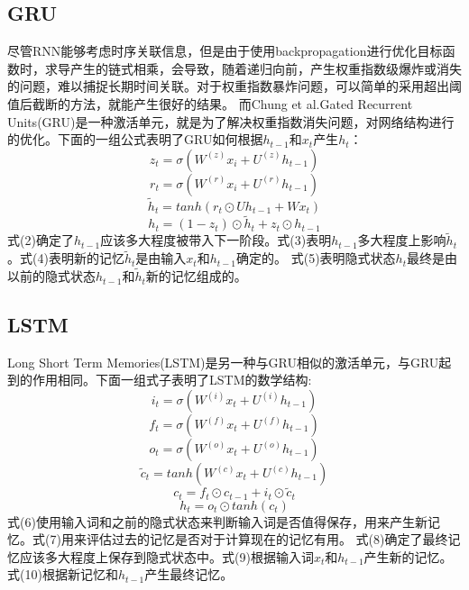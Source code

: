\subsection{GRU}
尽管RNN能够考虑时序关联信息，但是由于使用backpropagation进行优化目标函数时，求导产生的链式相乘，会导致，随着递归向前，产生权重指数级爆炸或消失的问题，难以捕捉长期时间关联。对于权重指数暴炸问题，可以简单的采用超出阈值后截断的方法，就能产生很好的结果。
而Chung et al.\cite{chung2015gated}Gated Recurrent Units(GRU)是一种激活单元，就是为了解决权重指数消失问题，对网络结构进行的优化。下面的一组公式表明了GRU如何根据$h_{t-1}$和$x_t$产生$h_{t}$：\\
\begin{equation}
z_t = \sigma (W^{(z)}x_i + U^{(z)}h_{t-1})
\end{equation}
\begin{equation}
r_t = \sigma (W^{(r)}x_i + U^{(r)}h_{t-1})
\end{equation}
\begin{equation}
\widetilde{h}_t = tanh(r_t \odot Uh_{t-1} + Wx_t)
\end{equation}
\begin{equation}
h_t = (1-z_t) \odot \widetilde{h}_t + z_t \odot h_{t-1}
\end{equation}
式(2)确定了$h_{t-1}$应该多大程度被带入下一阶段。式(3)表明$h_{t-1}$多大程度上影响$\widetilde{h}_t$。式(4)表明新的记忆$\widetilde{h}_t$是由输入$x_t$和$h_{t-1}$确定的。
式(5)表明隐式状态$h_t$最终是由以前的隐式状态$h_{t-1}$和$\widetilde{h}_t$新的记忆组成的。
\subsection{LSTM}
Long Short Term Memories(LSTM)\cite{hochreiter1997long}是另一种与GRU相似的激活单元，与GRU起到的作用相同。下面一组式子表明了LSTM的数学结构:\\
\begin{equation}
i_t = \sigma (W^{(i)}x_t + U^{(i)}h_{t-1})
\end{equation}
\begin{equation}
f_t = \sigma (W^{(f)}x_t + U^{(f)}h_{t-1})
\end{equation}
\begin{equation}
o_t = \sigma (W^{(o)}x_t + U^{(o)}h_{t-1})
\end{equation}
\begin{equation}
\widetilde{c}_t = tanh(W^{(c)}x_t + U^{(c)}h_{t-1})
\end{equation}
\begin{equation}
c_t = f_t \odot c_{t-1} + i_t \odot \widetilde{c}_t
\end{equation}
\begin{equation}
h_t = o_t \odot tanh(c_t)
\end{equation}
式(6)使用输入词和之前的隐式状态来判断输入词是否值得保存，用来产生新记忆。式(7)用来评估过去的记忆是否对于计算现在的记忆有用。
式(8)确定了最终记忆应该多大程度上保存到隐式状态中。式(9)根据输入词$x_t$和$h_{t-1}$产生新的记忆。式(10)根据新记忆和$h_{t-1}$产生最终记忆。

